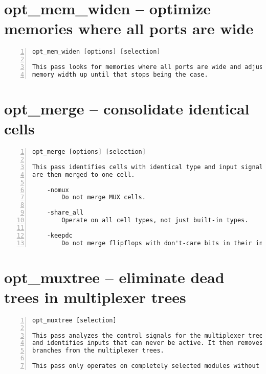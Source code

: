 \section{opt\_mem\_widen -- optimize memories where all ports are wide}
\label{cmd:opt_mem_widen}
\begin{lstlisting}[numbers=left,frame=single]
    opt_mem_widen [options] [selection]

This pass looks for memories where all ports are wide and adjusts the base
memory width up until that stops being the case.
\end{lstlisting}

\section{opt\_merge -- consolidate identical cells}
\label{cmd:opt_merge}
\begin{lstlisting}[numbers=left,frame=single]
    opt_merge [options] [selection]

This pass identifies cells with identical type and input signals. Such cells
are then merged to one cell.

    -nomux
        Do not merge MUX cells.

    -share_all
        Operate on all cell types, not just built-in types.

    -keepdc
        Do not merge flipflops with don't-care bits in their initial value.
\end{lstlisting}

\section{opt\_muxtree -- eliminate dead trees in multiplexer trees}
\label{cmd:opt_muxtree}
\begin{lstlisting}[numbers=left,frame=single]
    opt_muxtree [selection]

This pass analyzes the control signals for the multiplexer trees in the design
and identifies inputs that can never be active. It then removes this dead
branches from the multiplexer trees.

This pass only operates on completely selected modules without processes.
\end{lstlisting}

